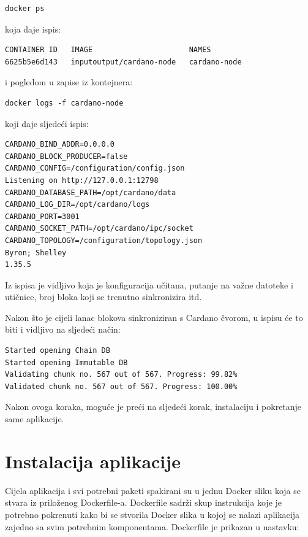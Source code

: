 \documentclass[times, utf8, diplomski]{fer}
\begin{document}
\begin{verbatim}
docker ps
\end{verbatim}

koja daje ispis:

\begin{lstlisting}
CONTAINER ID   IMAGE                      NAMES
6625b5e6d143   inputoutput/cardano-node   cardano-node
\end{lstlisting}

i pogledom u zapise iz kontejnera:

\begin{verbatim}
docker logs -f cardano-node
\end{verbatim}

koji daje sljedeći ispis:

\begin{lstlisting}
CARDANO_BIND_ADDR=0.0.0.0
CARDANO_BLOCK_PRODUCER=false
CARDANO_CONFIG=/configuration/config.json
Listening on http://127.0.0.1:12798
CARDANO_DATABASE_PATH=/opt/cardano/data
CARDANO_LOG_DIR=/opt/cardano/logs
CARDANO_PORT=3001
CARDANO_SOCKET_PATH=/opt/cardano/ipc/socket
CARDANO_TOPOLOGY=/configuration/topology.json
Byron; Shelley
1.35.5
\end{lstlisting}

Iz ispisa je vidljivo koja je konfiguracija učitana, putanje na važne datoteke i utičnice, broj bloka koji se trenutno sinkronizira itd.

Nakon što je cijeli lanac blokova sinkroniziran s Cardano čvorom, u ispisu će to biti i vidljivo na sljedeći način:

\begin{lstlisting}
Started opening Chain DB
Started opening Immutable DB
Validating chunk no. 567 out of 567. Progress: 99.82%
Validated chunk no. 567 out of 567. Progress: 100.00%
\end{lstlisting}

Nakon ovoga koraka, moguće je preći na sljedeći korak, instalaciju i pokretanje same aplikacije.

\section{Instalacija aplikacije}

Cijela aplikacija i svi potrebni paketi spakirani su u jednu Docker sliku koja se stvara iz priloženog Dockerfile-a. Dockerfile sadrži skup instrukcija koje je potrebno pokrenuti kako bi se stvorila Docker slika u kojoj se nalazi aplikacija zajedno sa svim potrebnim komponentama. Dockerfile je prikazan u nastavku:
\end{document}
